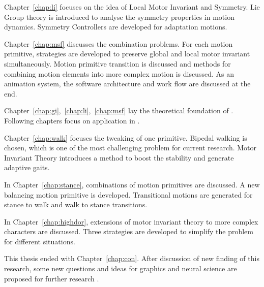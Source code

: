 Chapter~\ref{chap:li} focuses on the idea of Local Motor Invariant and Symmetry.
Lie Group theory is  introduced  to analyse the symmetry properties in motion dynamics.
Symmetry Controllers are developed for adaptation motions.
 


Chapter~\ref{chap:msf} discusses the combination problems.
For each motion primitive,  strategies are developed to preserve global and local motor invariant simultaneously.
Motion primitive transition is discussed and methods for combining motion elements into more complex motion is discussed.
As an animation system, the software architecture and work flow are discussed at the end.

Chapter~\ref{chap:gi},~\ref{chap:li},~\ref{chap:msf} lay the theoretical foundation of \moit.
Following chapters focus on application in \cms.



Chapter~\ref{chap:walk} focuses the tweaking of one primitive.
Bipedal walking is chosen, which is one of the most challenging problem for current \cms research.
Motor Invariant Theory introduces a method to boost the stability and generate adaptive gaits.


In Chapter~\ref{chap:stance}, combinations of motion primitives are discussed.
A new balancing motion primitive is developed. 
Transitional motions are generated for stance to walk and walk to stance transitions.

In Chapter~\ref{chap:highdor}, extensions of motor invariant theory to more complex characters are discussed.
Three strategies are developed to simplify the problem for different situations.

This thesis ended with Chapter~\ref{chap:con}. 
After discussion of new finding of this research, some new questions and ideas for graphics and neural science are proposed for further research .








